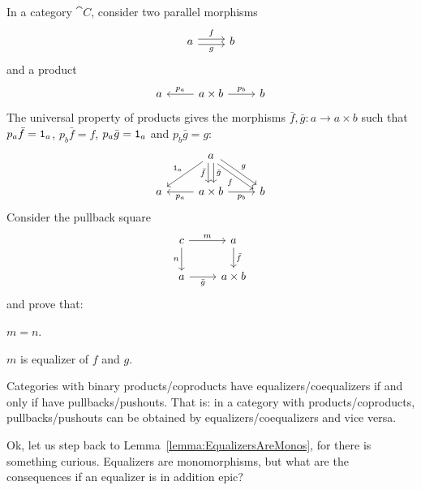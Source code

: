 \begin{exercise}
In a category \(\cat C\), consider two parallel morphisms
\[\begin{tikzcd}
a \ar["f", r, shift left] \ar["g", r, shift right, swap] & b
\end{tikzcd}\]
and a product
\[\begin{tikzcd}
a & a \times b \ar["{p_a}", l, swap] \ar["{p_b}", r] & b
\end{tikzcd}\]
The universal property of products gives the morphisms \(\bar f, \bar g : a \to a \times b\) such that \(p_a \bar f = \mathtt 1_a\), \(p_b \bar f = f\), \(p_a \bar g = \mathtt 1_a\) and \(p_b \bar g = g\): 
\[\begin{tikzcd}
& a \ar["{\id_a}", dl, swap] \ar["{\bar f}", d, shift right, swap] \ar["{\bar g}", d, shift left] \ar["f", dr, shift right, swap] \ar["g", dr, shift left] \\
a & a \times b \ar["{p_a}", l] \ar["{p_b}", r, swap] & b
\end{tikzcd}\]
Consider the pullback square
\[\begin{tikzcd}
c \ar["m", r] \ar["n", d, swap] & a \ar["{\bar f}", d] \\
a \ar["{\bar g}", r, swap] & a \times b
\end{tikzcd}\]
and prove that:
\begin{tcbenum}
\item \(m = n\).
\item \(m\) is equalizer of \(f\) and \(g\).
\end{tcbenum}
\end{exercise}


\begin{proposition}
Categories with binary products/coproducts have equalizers/coequalizers if and only if have pullbacks/pushouts. That is: in a category with products/coproducts, pullbacks/pushouts can be obtained by equalizers/coequalizers and vice versa.  
\end{proposition}




Ok, let us step back to Lemma~\ref{lemma:EqualizersAreMonos}, for there is something curious. Equalizers are monomorphisms, but what are the consequences if an equalizer is in addition epic?

